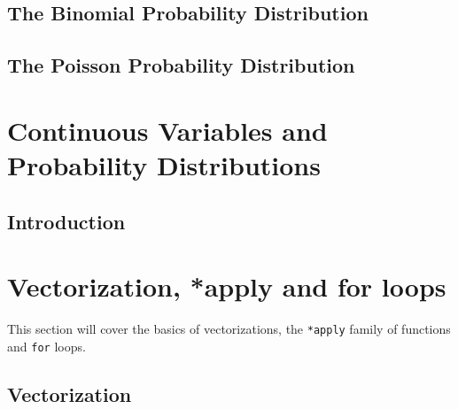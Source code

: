\documentclass[]{book}
\theoremstyle{definition}
\theoremstyle{definition}
\theoremstyle{definition}
\theoremstyle{remark}
\begin{document}
\section{The Binomial Probability
Distribution}\label{the-binomial-probability-distribution}

\section{The Poisson Probability
Distribution}\label{the-poisson-probability-distribution}

\hypertarget{continuous-variables-and-probability-distributions}{\chapter{Continuous
Variables and Probability
Distributions}\label{continuous-variables-and-probability-distributions}}

\section*{Introduction}\label{introduction-1}

\appendix


\chapter{Vectorization, *apply and for
loops}\label{vectorization-apply-and-for-loops}

This section will cover the basics of vectorizations, the
\texttt{*apply} family of functions and \texttt{for} loops.

\section{Vectorization}\label{vectorization}
\end{document}
